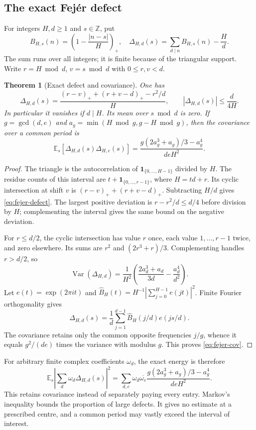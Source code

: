 \documentclass[11pt,a4paper]{article}
\newtheorem{theorem}{Theorem}[section]
\theoremstyle{definition}
\theoremstyle{remark}
\newcommand{\ind}{\mathbf1}
\begin{document}
\subsection{The exact Fej\'er defect}
For integers $H,d\ge1$ and $s\in\mathbb Z$, put
\[ B_{H,s}(n)=\left(1-\frac{|n-s|}{H}\right)_+,
 \quad\Delta_{H,d}(s)=\sum_{d\mid n}B_{H,s}(n)-\frac Hd.\]
The sum runs over all integers; it is finite because of the triangular support. Write $r=H\bmod d$, $v=s\bmod d$ with $0\le r,v<d$.
\begin{theorem}[Exact defect and covariance]\label{thm:fejer}
One has
\begin{equation}\label{eq:fejer-defect}
 \Delta_{H,d}(s)=\frac{(r-v)_++(r+v-d)_+-r^2/d}{H},
 \qquad |\Delta_{H,d}(s)|\le\frac d{4H}.
\end{equation}
In particular it vanishes if $d\mid H$. Its mean over $s\bmod d$ is zero. If $g=\gcd(d,e)$ and $a_g=\min(H\bmod g,g-H\bmod g)$, then the covariance over a common period is
\begin{equation}\label{eq:fejer-cov}
 \mathbb E_s[\Delta_{H,d}(s)\Delta_{H,e}(s)]
 =\frac{g(2a_g^3+a_g)/3-a_g^4}{deH^2}.
\end{equation}
\end{theorem}
\begin{proof}
The triangle is the autocorrelation of $\ind_{\{0,\ldots,H-1\}}$ divided by $H$. The residue counts of this interval are $t+\ind_{\{0,\ldots,r-1\}}$, where $H=td+r$. Its cyclic intersection at shift $v$ is $(r-v)_++(r+v-d)_+$. Subtracting $H/d$ gives \eqref{eq:fejer-defect}. The largest positive deviation is $r-r^2/d\le d/4$ before division by $H$; complementing the interval gives the same bound on the negative deviation.

For $r\le d/2$, the cyclic intersection has value $r$ once, each value $1,\ldots,r-1$ twice, and zero elsewhere. Its sums are $r^2$ and $(2r^3+r)/3$. Complementing handles $r>d/2$, so
\[\operatorname{Var}(\Delta_{H,d})
 =\frac1{H^2}\left(\frac{2a_d^3+a_d}{3d}-\frac{a_d^4}{d^2}\right).\]
Let $e(t)=\exp(2\pi it)$ and $\widehat B_H(t)=H^{-1}|\sum_{j=0}^{H-1}e(jt)|^2$. Finite Fourier orthogonality gives
\[ \Delta_{H,d}(s)=\frac1d\sum_{j=1}^{d-1}\widehat B_H(j/d)e(js/d).\]
The covariance retains only the common opposite frequencies $j/g$, whence it equals $g^2/(de)$ times the variance with modulus $g$. This proves \eqref{eq:fejer-cov}.
\end{proof}
For arbitrary finite complex coefficients $\omega_d$, the exact energy is therefore
\[\mathbb E_s\left|\sum_d\omega_d\Delta_{H,d}(s)\right|^2
 =\sum_{d,e}\omega_d\overline{\omega_e}
 \frac{g(2a_g^3+a_g)/3-a_g^4}{deH^2}.\]
This retains covariance instead of separately paying every entry. Markov's inequality bounds the proportion of large defects. It gives no estimate at a prescribed centre, and a common period may vastly exceed the interval of interest.
\end{document}
